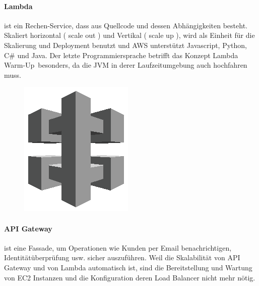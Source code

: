 \documentclass[
12pt,
english,
ngerman,
headsepline,
twoside,
openright,
numbers=noenddot,version=first
]{scrreprt}
\begin{document}
\paragraph{Lambda} ist ein Rechen-Service, dass aus Quellcode und dessen Abhängigkeiten besteht. Skaliert horizontal ( scale out ) und Vertikal ( scale up ), wird als Einheit für die Skalierung und Deployment benutzt und \acrshort{AWS} unterstützt Javascript, Python, C\# und Java. Der letzte Programmiersprache betrifft das Konzept \glqq Lambda Warm-Up\grqq\ besonders, da die \acrfull{JVM} in derer Laufzeitumgebung auch hochfahren muss.


\begin{figure}
	\includegraphics[width=0.9\linewidth]{./pics/aws/MobileServices_GRAYSCALE_AmazonAPIGateway.eps}
\end{figure}
\paragraph{API Gateway} ist eine Fassade, um Operationen wie Kunden per Email benachrichtigen, Identitätüberprüfung usw. sicher auszuführen. Weil die Skalabilität von API Gateway und von Lambda automatisch ist, sind die Bereitstellung und Wartung von EC2 Instanzen und die Konfiguration deren Load Balancer nicht mehr nötig. 
\end{document}
